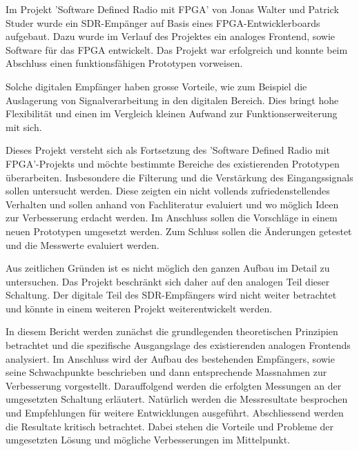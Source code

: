 Im Projekt 'Software Defined Radio mit FPGA' von Jonas Walter und Patrick Studer\cite{SDRprev} wurde ein SDR-Empänger auf Basis eines FPGA-Entwicklerboards aufgebaut. Dazu wurde im Verlauf des Projektes ein analoges Frontend, sowie Software für das FPGA entwickelt. Das Projekt war erfolgreich und konnte beim Abschluss einen funktionsfähigen Prototypen vorweisen.

Solche digitalen Empfänger haben grosse Vorteile, wie zum Beispiel die Auslagerung von Signalverarbeitung in den digitalen Bereich. Dies bringt hohe Flexibilität und einen im Vergleich kleinen Aufwand zur Funktionserweiterung mit sich.

Dieses Projekt versteht sich als Fortsetzung des 'Software Defined Radio mit FPGA'-Projekts und möchte bestimmte Bereiche des existierenden Prototypen überarbeiten. Insbesondere die Filterung und die Verstärkung des Eingangssignals sollen untersucht werden. Diese zeigten ein nicht vollends zufriedenstellendes Verhalten und sollen anhand von Fachliteratur evaluiert und wo möglich Ideen zur Verbesserung erdacht werden. Im Anschluss sollen die Vorschläge in einem neuen Prototypen umgesetzt werden. Zum Schluss sollen die Änderungen getestet und die Messwerte evaluiert werden.

Aus zeitlichen Gründen ist es nicht möglich den ganzen Aufbau im Detail zu untersuchen. Das Projekt beschränkt sich daher auf den analogen Teil dieser Schaltung. Der digitale Teil des SDR-Empfängers wird nicht weiter betrachtet und könnte in einem weiteren Projekt weiterentwickelt werden.

In diesem Bericht werden zunächst die grundlegenden theoretischen Prinzipien betrachtet und die spezifische Ausgangslage des existierenden analogen Frontends analysiert.
Im Anschluss wird der Aufbau des bestehenden Empfängers, sowie seine Schwachpunkte beschrieben und dann entsprechende Massnahmen zur Verbesserung vorgestellt. Darauffolgend werden die erfolgten Messungen an der umgesetzten Schaltung erläutert. Natürlich werden die Messresultate besprochen und Empfehlungen für weitere Entwicklungen ausgeführt. Abschliessend werden die Resultate kritisch betrachtet. Dabei stehen die Vorteile und Probleme der umgesetzten Lösung und mögliche Verbesserungen im Mittelpunkt.
